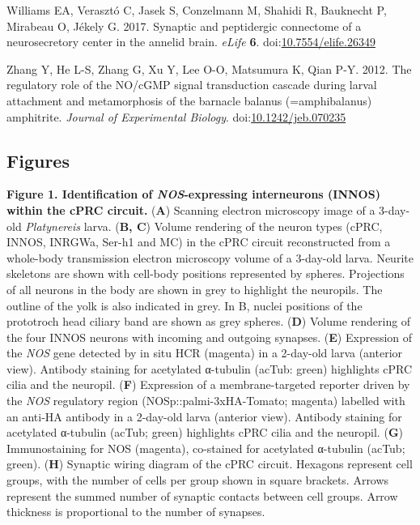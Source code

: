 \documentclass[
  11pt,
  letterpaper,
  DIV=11,
  numbers=noendperiod]{scrartcl}
\newlength{\cslhangindent}
\newenvironment{CSLReferences}[2] %
 {\begin{list}{}{%
  \setlength{\itemindent}{0pt}
  \setlength{\leftmargin}{0pt}
  \setlength{\parsep}{0pt}
  \ifodd #1
   \setlength{\leftmargin}{\cslhangindent}
   \setlength{\itemindent}{-1\cslhangindent}
  \fi
  \setlength{\itemsep}{#2\baselineskip}}}
 {\end{list}}
\begin{document}
\begin{CSLReferences}{1}{0}
Williams EA, Verasztó C, Jasek S, Conzelmann M, Shahidi R, Bauknecht P,
Mirabeau O, Jékely G. 2017. Synaptic and peptidergic connectome of a
neurosecretory center in the annelid brain. \emph{eLife} \textbf{6}.
doi:\href{https://doi.org/10.7554/elife.26349}{10.7554/elife.26349}

Zhang Y, He L-S, Zhang G, Xu Y, Lee O-O, Matsumura K, Qian P-Y. 2012.
The regulatory role of the NO/cGMP signal transduction cascade during
larval attachment and metamorphosis of the barnacle balanus
(=amphibalanus) amphitrite. \emph{Journal of Experimental Biology}.
doi:\href{https://doi.org/10.1242/jeb.070235}{10.1242/jeb.070235}

\end{CSLReferences}

\subsection{Figures}\label{figures}

\textbf{Figure 1. Identification of \emph{NOS}-expressing interneurons
(INNOS) within the cPRC circuit.} (\textbf{A}) Scanning electron
microscopy image of a 3-day-old \emph{Platynereis} larva. (\textbf{B,
C}) Volume rendering of the neuron types (cPRC, INNOS, INRGWa, Ser-h1
and MC) in the cPRC circuit reconstructed from a whole-body transmission
electron microscopy volume of a 3-day-old larva. Neurite skeletons are
shown with cell-body positions represented by spheres. Projections of
all neurons in the body are shown in grey to highlight the neuropils.
The outline of the yolk is also indicated in grey. In B, nuclei
positions of the prototroch head ciliary band are shown as grey spheres.
(\textbf{D}) Volume rendering of the four INNOS neurons with incoming
and outgoing synapses. (\textbf{E}) Expression of the \emph{NOS} gene
detected by in situ HCR (magenta) in a 2-day-old larva (anterior view).
Antibody staining for acetylated α-tubulin (acTub: green) highlights
cPRC cilia and the neuropil. (\textbf{F}) Expression of a
membrane-targeted reporter driven by the \emph{NOS} regulatory region
(NOSp::palmi-3xHA-Tomato; magenta) labelled with an anti-HA antibody in
a 2-day-old larva (anterior view). Antibody staining for acetylated
α-tubulin (acTub; green) highlights cPRC cilia and the neuropil.
(\textbf{G}) Immunostaining for NOS (magenta), co-stained for acetylated
α-tubulin (acTub; green). (\textbf{H}) Synaptic wiring diagram of the
cPRC circuit. Hexagons represent cell groups, with the number of cells
per group shown in square brackets. Arrows represent the summed number
of synaptic contacts between cell groups. Arrow thickness is
proportional to the number of synapses.
\end{document}
